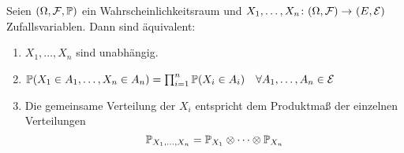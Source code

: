 \begin{satz}
	\label{3_21_satz}
	Seien $(\Omega, \F, \P)$ ein Wahrscheinlichkeitsraum und $\abb{X_1, \dots, X_n}{(\Omega,\F)}{(E, \Ecal)}$ Zufallsvariablen. Dann sind äquivalent:
	\begin{enumerate}[label=(\arabic*), nolistsep]
		\item $X_1 , \dots , X_n$ sind unabhängig.
		\item $\P(X_1 \in A_1 , \dots , X_n \in A_n) = \prod_{i=1}^n \P(X_i \in A_i) \quad \forall A_1, \dots , A_n \in \Ecal$
		\item Die gemeinsame Verteilung der $X_i$ entspricht dem Produktmaß der einzelnen Verteilungen
		\begin{equation*}
			\P_{X_1 , \dots , X_n} = \P_{X_1} \otimes \dots \otimes \P_{X_n}
		\end{equation*}
	\end{enumerate}
\end{satz}
